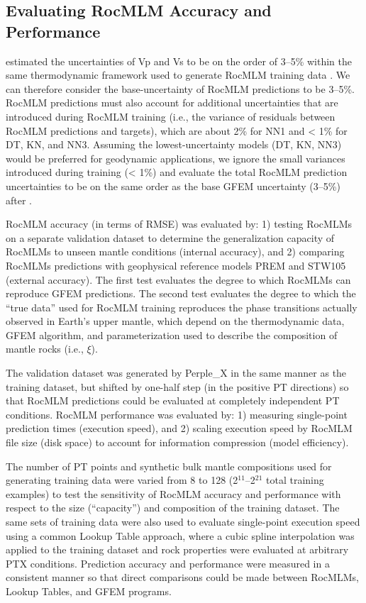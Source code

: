 \documentclass[draft,linenumbers]{agujournal2018}
\begin{document}
\subsection{Evaluating RocMLM Accuracy and Performance}\label{sec:evaluate-rocmlms}

\citet{connolly2016} estimated the uncertainties of Vp and Vs to be on the order of 3--5\% within the same thermodynamic framework used to generate RocMLM training data \citep{stixrude2005}. We can therefore consider the base-uncertainty of RocMLM predictions to be 3--5\%. RocMLM predictions must also account for additional uncertainties that are introduced during RocMLM training (i.e., the variance of residuals between RocMLM predictions and targets), which are about 2\% for NN1 and \textless{} 1\% for DT, KN, and NN3. Assuming the lowest-uncertainty models (DT, KN, NN3) would be preferred for geodynamic applications, we ignore the small variances introduced during training (\textless{} 1\%) and evaluate the total RocMLM prediction uncertainties to be on the same order as the base GFEM uncertainty (3--5\%) after \citet{connolly2016}.

RocMLM accuracy (in terms of RMSE) was evaluated by: 1) testing RocMLMs on a separate validation dataset to determine the generalization capacity of RocMLMs to unseen mantle conditions (internal accuracy), and 2) comparing RocMLMs predictions with geophysical reference models PREM and STW105 (external accuracy). The first test evaluates the degree to which RocMLMs can reproduce GFEM predictions. The second test evaluates the degree to which the ``true data'' used for RocMLM training reproduces the phase transitions actually observed in Earth's upper mantle, which depend on the thermodynamic data, GFEM algorithm, and parameterization used to describe the composition of mantle rocks (i.e., \(\xi\)).

The validation dataset was generated by Perple\_X in the same manner as the training dataset, but shifted by one-half step (in the positive PT directions) so that RocMLM predictions could be evaluated at completely independent PT conditions. RocMLM performance was evaluated by: 1) measuring single-point prediction times (execution speed), and 2) scaling execution speed by RocMLM file size (disk space) to account for information compression (model efficiency).

The number of PT points and synthetic bulk mantle compositions used for generating training data were varied from 8 to 128 (2\(^{11}\)--2\(^{21}\) total training examples) to test the sensitivity of RocMLM accuracy and performance with respect to the size (``capacity'') and composition of the training dataset. The same sets of training data were also used to evaluate single-point execution speed using a common Lookup Table approach, where a cubic spline interpolation was applied to the training dataset and rock properties were evaluated at arbitrary PTX conditions. Prediction accuracy and performance were measured in a consistent manner so that direct comparisons could be made between RocMLMs, Lookup Tables, and GFEM programs.
\end{document}
